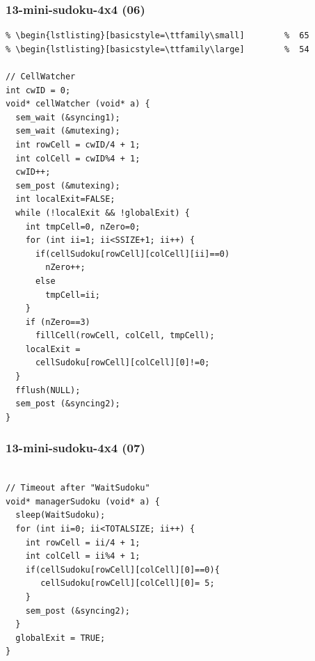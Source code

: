\documentclass[aspectratio=169, xcolor=table, notheorems, hyperref={pdfpagelabels=false}]{beamer}
\begin{document}
\begin{frame}[fragile]
\frametitle{13-mini-sudoku-4x4 (06)}
\begin{lstlisting}[basicstyle=\ttfamily\tiny]         % 108
% \begin{lstlisting}[basicstyle=\ttfamily\footnotesize] %  72
% \begin{lstlisting}[basicstyle=\ttfamily\small]        %  65
% \begin{lstlisting}[basicstyle=\ttfamily\large]        %  54

// CellWatcher
int cwID = 0;
void* cellWatcher (void* a) {
  sem_wait (&syncing1);
  sem_wait (&mutexing);
  int rowCell = cwID/4 + 1;
  int colCell = cwID%4 + 1;
  cwID++;
  sem_post (&mutexing);
  int localExit=FALSE;
  while (!localExit && !globalExit) {
    int tmpCell=0, nZero=0;
    for (int ii=1; ii<SSIZE+1; ii++) {
      if(cellSudoku[rowCell][colCell][ii]==0) 
        nZero++;
      else 
        tmpCell=ii;
    }
    if (nZero==3) 
      fillCell(rowCell, colCell, tmpCell);
    localExit = 
      cellSudoku[rowCell][colCell][0]!=0;
  }
  fflush(NULL);
  sem_post (&syncing2);
}

\end{lstlisting}
\end{frame}

\begin{frame}[fragile]
\frametitle{13-mini-sudoku-4x4 (07)}
\begin{lstlisting}[basicstyle=\ttfamily\large]        %  54

// Timeout after "WaitSudoku"
void* managerSudoku (void* a) {
  sleep(WaitSudoku);
  for (int ii=0; ii<TOTALSIZE; ii++) {
    int rowCell = ii/4 + 1;
    int colCell = ii%4 + 1;
    if(cellSudoku[rowCell][colCell][0]==0){
       cellSudoku[rowCell][colCell][0]= 5;
    }
    sem_post (&syncing2);
  }
  globalExit = TRUE;
}

\end{lstlisting}
\end{frame}
\end{document}
